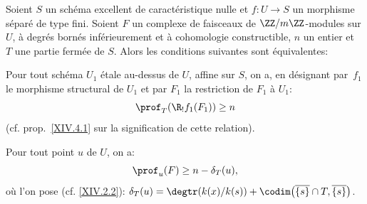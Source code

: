\setcounter{subsection}{1}

\begin{theoreme} \label{XIV.4.2}
Soient $S$ un sch\'ema excellent de caract\'eristique nulle et \hbox{$f\colon U\!\to\! S$} un morphisme s\'epar\'e de type fini. Soient $F$ un complexe de faisceaux de $\ZZ/m\ZZ$-modules sur $U$, \`a degr\'es born\'es inf\'erieurement et \`a cohomologie constructible, $n$ un entier et~$T$ une partie ferm\'ee de $S$. Alors les conditions suivantes sont \'equivalentes:
\begin{enumeratei}
\item
Pour tout sch\'ema $U_{1}$ \'etale au-dessus de $U$, affine sur $S$, on a, en d\'esignant par~$f_{1}$ le morphisme structural de $U_{1}$ et par $F_{1}$ la restriction de $F_{1}$ \`a $U_{1}$:
$$
\prof_{T}(\R_{!}f_{1}(F_{1}))\geq n$$
(cf. prop.\, \ref{XIV.4.1} sur la signification de cette relation).
\item
Pour tout point $u$ de $U$, on a:
$$
\prof_{u}(F)\geq n-\delta_{T}(u),
$$
o\`u l'on pose (cf. \ref{XIV.2.2}): $\delta_{T}(u)=\degtr(k(x)/k(s))+\codim\big(\overline{\{ s\} }\cap T, \overline{\{ s\} } \big)$.
\end{enumeratei}
\end{theoreme}

